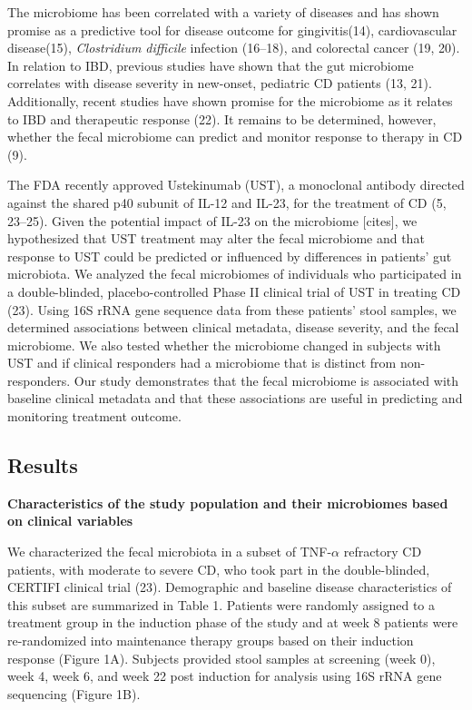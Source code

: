 \documentclass[11pt,]{article}
\begin{document}
The microbiome has been correlated with a variety of diseases and has
shown promise as a predictive tool for disease outcome for
gingivitis(14), cardiovascular disease(15), \emph{Clostridium difficile}
infection (16--18), and colorectal cancer (19, 20). In relation to IBD,
previous studies have shown that the gut microbiome correlates with
disease severity in new-onset, pediatric CD patients (13, 21).
Additionally, recent studies have shown promise for the microbiome as it
relates to IBD and therapeutic response (22). It remains to be
determined, however, whether the fecal microbiome can predict and
monitor response to therapy in CD (9).

The FDA recently approved Ustekinumab (UST), a monoclonal antibody
directed against the shared p40 subunit of IL-12 and IL-23, for the
treatment of CD (5, 23--25). Given the potential impact of IL-23 on the
microbiome {[}cites{]}, we hypothesized that UST treatment may alter the
fecal microbiome and that response to UST could be predicted or
influenced by differences in patients' gut microbiota. We analyzed the
fecal microbiomes of individuals who participated in a double-blinded,
placebo-controlled Phase II clinical trial of UST in treating CD (23).
Using 16S rRNA gene sequence data from these patients' stool samples, we
determined associations between clinical metadata, disease severity, and
the fecal microbiome. We also tested whether the microbiome changed in
subjects with UST and if clinical responders had a microbiome that is
distinct from non-responders. Our study demonstrates that the fecal
microbiome is associated with baseline clinical metadata and that these
associations are useful in predicting and monitoring treatment outcome.

\subsection{Results}\label{results}

\textbf{Characteristics of the study population and their microbiomes
based on clinical variables}

We characterized the fecal microbiota in a subset of TNF-\({\alpha}\)
refractory CD patients, with moderate to severe CD, who took part in the
double-blinded, CERTIFI clinical trial (23). Demographic and baseline
disease characteristics of this subset are summarized in Table 1.
Patients were randomly assigned to a treatment group in the induction
phase of the study and at week 8 patients were re-randomized into
maintenance therapy groups based on their induction response (Figure
1A). Subjects provided stool samples at screening (week 0), week 4, week
6, and week 22 post induction for analysis using 16S rRNA gene
sequencing (Figure 1B).
\end{document}
